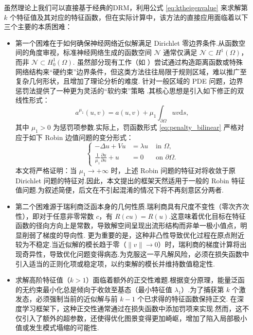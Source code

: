 虽然理论上我们可以直接基于经典的DRM，利用公式 \eqref{eq:ktheigenvalue} 来求解第 $k$ 个特征值及其对应的特征函数，但在实际计算中，该方法的直接应用面临着以下三个主要的本质困难：

\begin{itemize}
\item 第一个困难在于如何确保神经网络近似解满足 Dirichlet 零边界条件.从函数空间的角度审视，标准神经网络生成的函数空间 $\mathcal{N}$ 通常仅满足 $\mathcal{N} \subset H^{1}(\Omega)$，而非 $\mathcal{N} \subset H^{1}_{0}(\Omega)$.
虽然部分现有工作（如 \cite{lu2021priorieigen}）尝试通过构造距离函数或特殊网络结构来“硬约束”边界条件，但这类方法往往局限于规则区域，难以推广至复杂几何形状，且增加了理论分析的难度.
针对一般区域的 PDE 问题，边界惩罚法提供了一种更为灵活的“软约束”策略 \cite{duan2022convergence, Mller2021ErrorEF}.其核心思想是引入如下修正的双线性形式：
\begin{equation}\label{eq:penalty_bilinear}
a^{\mu_1}(u,v) = a(u,v) + \mu_1\int_{\partial \Omega}uv \text{d}s,
  \end{equation}
其中 $\mu_1 > 0$ 为惩罚项参数.实际上，罚函数形式 \ref{eq:penalty_bilinear} 严格对应于如下 Robin 边值问题的变分形式：
\begin{equation*}
\left\{\begin{aligned}
-\Delta u + V u &= \lambda u & \text{ in } \Omega, \\
\frac{1}{\mu_1}\frac{\partial u}{\partial n} + u &= 0 & \text{ on } \partial\Omega.
\end{aligned}\right.
\end{equation*}
本文将严格证明：当 $\mu_1 \to +\infty$ 时，上述 Robin 问题的特征对将收敛于原 Dirichlet 问题的特征对.因此，本文提出的框架天然适用于一般的 Robin 特征值问题.为叙述简便，后文在不引起混淆的情况下将不再刻意区分两者.

\item 第二个困难源于瑞利商泛函本身的几何性质.瑞利商具有尺度不变性（零次齐次性），即对于任意非零常数 $c$，有 $R(c u) = R(u)$.这意味着优化目标在特征函数的径向方向上是常数，导致解空间呈现出流形结构而非单一极小值点，明显削弱了梯度的导向性.
更为重要的是，这种非凸性导致优化过程在原点附近较为不稳定.当近似解的模长趋于零（$\|v\| \to 0$）时，瑞利商的梯度计算将出现奇异性，导致优化问题变得病态.为克服这一平凡解风险，必须在损失函数中引入适当的正则化项或稳定项\cite{Weinan2017The}，以约束解的模长并维持数值稳定性.

\item 求解高阶特征值（$k > 1$）面临着额外的正交性难题.根据变分原理，能量泛函的无约束最小化总是倾向于收敛至基态（最小特征值 $\lambda_1$）.为了捕获第 $k$ 个激发态，必须强制当前的近似解与前 $k-1$ 个已求得的特征函数保持正交.
在深度学习框架下，这种正交性通常通过在损失函数中添加罚项来实现.然而，这不仅引入了额外的超参数，还使得优化图景变得更加崎岖，增加了陷入局部极小值或发生模式塌缩的可能性.
\end{itemize}

